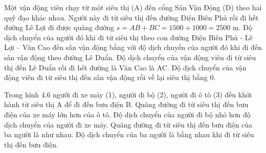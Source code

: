 \begin{ex}
Một vận động viên chạy từ một siêu thị (A) đến cổng Sân Vận Động (D) theo hai quỹ đạo khác nhau.
\choiceTF
{\True Người này đi từ siêu thị đến đường Điện Biên Phủ rồi đi hết đường Lê Lợi đi được quãng đường $s = AB + BC = 1500 + 1000 = 2500$ m.}
{\True Độ dịch chuyển của người đó khi đi từ siêu thị theo con đường Điện Biên Phủ - Lê Lợi – Văn Cao đến sân vận động bằng với độ dịch chuyển của người đó khi đi đến sân vận động theo đường Lê Duẩn.}
{\True Độ dịch chuyển của vận động viên đi từ siêu thị đến Lê Duẩn rồi đi hết đường là Văn Cao là AC.}
{\True Độ dịch chuyển của vận động viên đi từ siêu thị đến sân vận động rồi về lại siêu thị bằng 0.}
\end{ex}

\begin{ex}
Trong hình 4.6 người đi xe máy (1), người đi bộ (2), người đi ô tô (3) đều khởi hành từ siêu thị A để đi đến bưu điện B.
\choiceTF
{Quãng đường đi từ siêu thị đến bưu điện của xe máy lớn hơn của ô tô.}
{Độ dịch chuyển của người đi bộ nhỏ hơn độ dịch chuyển của người đi xe máy.}
{Quãng đường đi từ siêu thị đến bưu điện của ba người là như nhau.}
{\True Độ dịch chuyển của ba người là bằng nhau khi đi từ siêu thị đến bưu điện.}
\end{ex}

